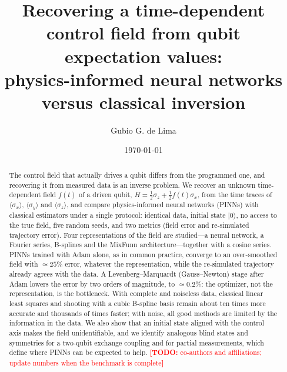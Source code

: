 \documentclass[aps,pra,twocolumn,superscriptaddress,10pt,longbibliography,floatfix]{revtex4-2}
\newif\ifshowtodos \showtodostrue
\newcommand{\TODO}[1]{\ifshowtodos\textcolor{red}{\textbf{[TODO:} #1\textbf{]}}\fi}
\begin{document}
\title{Recovering a time-dependent control field from qubit expectation values:\\
physics-informed neural networks versus classical inversion}

\author{Gubio G. de Lima}

\date{\today}

\begin{abstract}
The control field that actually drives a qubit differs from the programmed one, and recovering it from
measured data is an inverse problem. We recover an unknown time-dependent field $f(t)$ of a driven qubit,
$H=\tfrac12\sigma_z+\tfrac12 f(t)\sigma_x$, from the time traces of $\langle\sigma_x\rangle$,
$\langle\sigma_y\rangle$ and $\langle\sigma_z\rangle$, and compare physics-informed neural networks
(PINNs) with classical estimators under a single protocol: identical data, initial state $|0\rangle$, no
access to the true field, five random seeds, and two metrics (field error and re-simulated trajectory
error). Four representations of the field are studied---a neural network, a Fourier series, B-splines
and the MixFunn architecture---together with a cosine series. PINNs trained with Adam alone, as in
common practice, converge to an over-smoothed field with $\simeq25\%$ error, whatever the
representation, while the re-simulated trajectory already agrees with the data. A Levenberg--Marquardt
(Gauss--Newton) stage after Adam lowers the error by two orders of magnitude, to $\simeq0.2\%$: the
optimizer, not the representation, is the bottleneck. With complete and noiseless data, classical linear
least squares and shooting with a cubic B-spline basis remain about ten times more accurate and
thousands of times faster; with noise, all good methods are limited by the information in the data. We
also show that an initial state aligned with the control axis makes the field unidentifiable, and we
identify analogous blind states and symmetries for a two-qubit exchange coupling and for partial
measurements, which define where PINNs can be expected to help.
\TODO{co-authors and affiliations; update numbers when the benchmark is complete}
\end{abstract}

\maketitle
\end{document}

